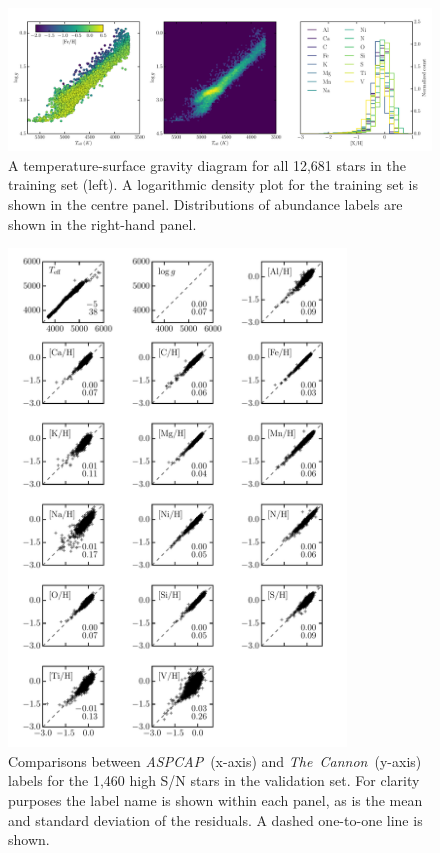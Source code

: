 \documentclass[12pt,preprint]{aastex}
\newcommand{\project}[1]{\textsl{#1}}
\newcommand{\TheCannon}{\project{The~Cannon}}
\newcommand{\acronym}[1]{{\small{#1}}}
\newcommand{\aspcap}{\project{\acronym{ASPCAP}}}
\begin{document}
\clearpage

\begin{figure}[p]
\centering
\includegraphics[width=\textwidth]{training_set_hrd.pdf}
\caption{A temperature-surface gravity diagram for all 12,681 stars in
the training set (left). A logarithmic density plot for the training set
is shown in the centre panel. Distributions of abundance labels
are shown in the right-hand panel.\label{fig:training_set_hrd}}
\end{figure}

\clearpage

\begin{figure}[p]
\centering
\includegraphics[width=0.8\textwidth]{regularized-model-validation.pdf}
\caption{Comparisons between \aspcap\ (x-axis) and \TheCannon\ (y-axis)
labels for the 1,460 high S/N stars in the validation set.  For clarity
purposes the label name is shown within each panel, as is the mean
and standard deviation of the residuals.  A
dashed one-to-one line is shown.
\label{fig:regularized-model-validation}}
\end{figure}
\end{document}
